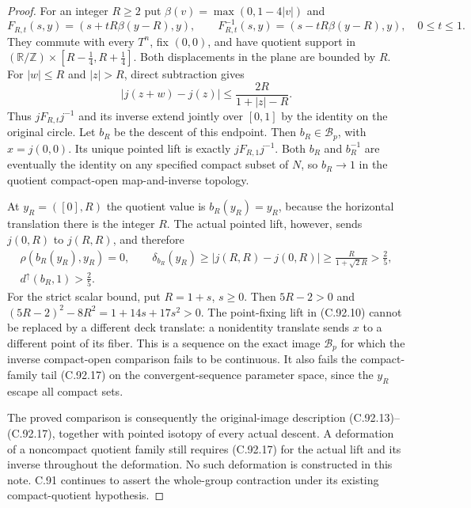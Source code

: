 \begin{proof}
For an integer $R\geq2$ put
$\beta(v)=\max(0,1-4|v|)$ and
\[
 F_{R,t}(s,y)=(s+tR\beta(y-R),y),\qquad
 F_{R,t}^{-1}(s,y)=(s-tR\beta(y-R),y),
 \quad 0\leq t\leq1 .
                                                               \tag{C.92.19}
\]
They commute with every $T^n$, fix $(0,0)$, and have quotient
support in
$(\mathbb R/\mathbb Z)\times[R-\tfrac14,R+\tfrac14]$.
Both displacements in the plane are bounded by $R$.
For $|w|\leq R$ and $|z|>R$, direct subtraction gives
\[
       |j(z+w)-j(z)|\leq\frac{2R}{1+|z|-R}.
                                                               \tag{C.92.20}
\]
Thus $jF_{R,t}j^{-1}$ and its inverse extend jointly over
$[0,1]$ by the identity on the original circle.
Let $b_R$ be the descent of this endpoint.
Then $b_R\in\mathscr B_p$, with $x=j(0,0)$.
Its unique pointed lift is exactly $jF_{R,1}j^{-1}$.
Both $b_R$ and $b_R^{-1}$ are eventually the identity
on any specified compact subset of $N$, so $b_R\to1$
in the quotient compact-open map-and-inverse topology.

At $y_R=([0],R)$ the quotient value is $b_R(y_R)=y_R$,
because the horizontal translation there is the integer $R$.
The actual pointed lift, however, sends
$j(0,R)$ to $j(R,R)$, and therefore
\[
 \begin{gathered}
 \rho(b_R(y_R),y_R)=0,\qquad
 \delta_{b_R}(y_R)\geq
       |j(R,R)-j(0,R)|\geq\frac{R}{1+\sqrt2R}>\frac25,\\
 d^\uparrow(b_R,1)>\frac25 .
 \end{gathered}                                                \tag{C.92.21}
\]
For the strict scalar bound, put $R=1+s$, $s\geq0$.
Then $5R-2>0$ and
$(5R-2)^2-8R^2=1+14s+17s^2>0$.
The point-fixing lift in (C.92.10) cannot be replaced by a
different deck translate: a nonidentity translate sends $x$
to a different point of its fiber.
This is a sequence on the exact image $\mathscr B_p$ for
which the inverse compact-open comparison fails to be continuous.
It also fails the compact-family tail (C.92.17) on the
convergent-sequence parameter space, since the $y_R$ escape
all compact sets.

The proved comparison is consequently the original-image
description (C.92.13)--(C.92.17), together with pointed isotopy
of every actual descent. A deformation of a noncompact
quotient family still requires (C.92.17) for the actual
lift and its inverse throughout the deformation.
No such deformation is constructed in this note.
C.91 continues to assert the whole-group contraction under
its existing compact-quotient hypothesis.

\end{proof}
